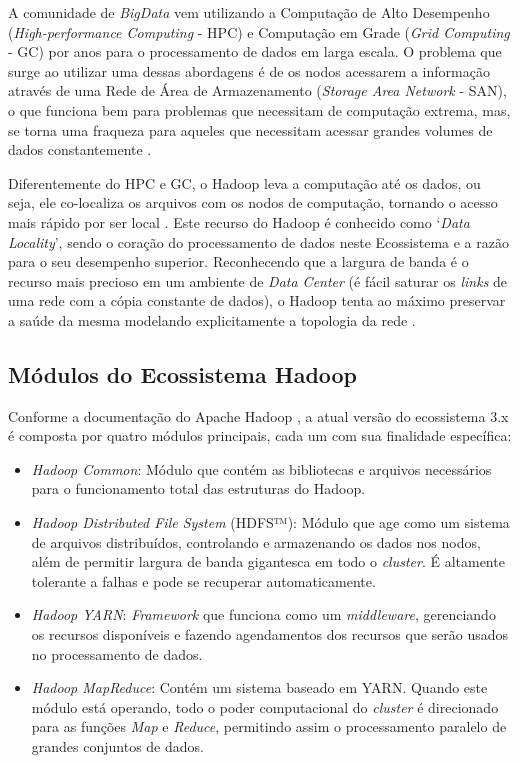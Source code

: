 A comunidade de \emph{BigData} vem utilizando a Computação de Alto Desempenho (\emph{High-performance Computing} - HPC) e Computação em Grade (\emph{Grid Computing} - GC) por anos para o processamento de dados em larga escala. O problema que surge ao utilizar uma dessas abordagens é de os nodos acessarem a informação através de uma Rede de Área de Armazenamento (\emph{Storage Area Network} - SAN), o que funciona bem para problemas que necessitam de computação extrema, mas, se torna uma fraqueza para aqueles que necessitam acessar grandes volumes de dados constantemente \cite{white2015hadoop}.

Diferentemente do HPC e GC, o Hadoop leva a computação até os dados, ou seja, ele co-localiza os arquivos com os nodos de computação, tornando o acesso mais rápido por ser local \cite{gray2004distributed}. Este recurso do Hadoop é conhecido como `\emph{Data Locality}', sendo o coração do processamento de dados neste Ecossistema e a razão para o seu desempenho superior. Reconhecendo que a largura de banda é o recurso mais precioso em um ambiente de \emph{Data Center} (é fácil saturar os \emph{links} de uma rede com a cópia constante de dados), o Hadoop tenta ao máximo preservar a saúde da mesma modelando explicitamente a topologia da rede \cite{white2015hadoop}.

\subsection{Módulos do Ecossistema Hadoop}

Conforme a documentação do Apache Hadoop \cite{ApacheDocumentation}, a atual versão do ecossistema 3.x é composta por quatro módulos principais, cada um com sua finalidade específica:

\begin{itemize}
    \item \emph{Hadoop Common}: Módulo que contém as bibliotecas e arquivos necessários para o funcionamento total das estruturas do Hadoop.
    \item \emph{Hadoop Distributed File System} (HDFS™): Módulo que age como um sistema de arquivos distribuídos, controlando e armazenando os dados nos nodos, além de permitir largura de banda gigantesca em todo o \emph{cluster}. É altamente tolerante a falhas e pode se recuperar automaticamente.
    \item \emph{Hadoop YARN}: \emph{Framework} que funciona como um \emph{middleware}, gerenciando os recursos disponíveis e fazendo agendamentos dos recursos que serão usados no processamento de dados.
    \item \emph{Hadoop MapReduce}: Contém um sistema baseado em YARN. Quando este módulo está operando, todo o poder computacional do \emph{cluster} é direcionado para as funções \emph{Map} e \emph{Reduce}, permitindo assim o processamento paralelo de grandes conjuntos de dados.
\end{itemize}


